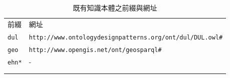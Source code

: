 \begin{table}[htbp]
\centering
\caption{既有知識本體之前綴與網址}
\label{tab:perfix}
\begin{adjustbox}{max width=\textwidth}
\renewcommand{\arraystretch}{1.4}
\begin{tabular}{>{\centering\arraybackslash}m{3cm} >{\arraybackslash}m{13cm}}
\Xhline{1.2pt}
前綴 & 網址 \\
\Xhline{1.2pt}
\texttt{dul} & \texttt{http://www.ontologydesignpatterns.org/ont/dul/DUL.owl\#} \\
\hline
\texttt{geo} & \texttt{http://www.opengis.net/ont/geosparql\#} \\
\hline
\texttt{ehn*} & - \\
\Xhline{1.2pt}
\multicolumn{2}{l}{\textit{Note:} *E-HowNet知識本體雖為知識本體之結構，然其並無發佈RDF/OWL格式，因而本研究以 ehn 作為代稱。} \\
\Xhline{1.2pt}
\end{tabular}
\end{adjustbox}
\end{table}